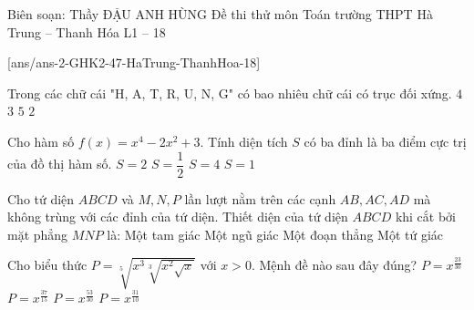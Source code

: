 
\begin{name}
{Biên soạn: Thầy ĐẬU ANH HÙNG}
{Đề thi thử môn Toán trường THPT Hà Trung – Thanh Hóa L1 – 18}
\end{name}
\setcounter{ex}{0}\setcounter{bt}{0}
[ans/ans-2-GHK2-47-HaTrung-ThanhHoa-18]
\begin{ex}%
Trong các chữ cái "H, A, T, R, U, N, G" có bao nhiêu chữ cái có trục đối xứng.
\choice
{\True $4$}
{$3$}
{$5$}
{$2$}
\end{ex}

\begin{ex}%
Cho hàm số $f(x)=x^4-2x^2+3$. Tính diện tích $S$ có ba đỉnh là ba điểm cực trị của đồ thị hàm số.
\choice
{$S=2$}
{$S=\dfrac{1}{2}$}
{$S=4$}
{\True $S=1$}
\end{ex}


\begin{ex}%
Cho tứ diện $ABCD$ và $M, N, P$ lần lượt nằm trên các cạnh $AB, AC, AD$ mà không trùng với các đỉnh của tứ diện. Thiết diện của tứ diện $ABCD$ khi cắt bởi mặt phẳng  $MNP$ là:
\choice
{\True Một tam giác}
{Một ngũ giác}
{Một đoạn thẳng}
{Một tứ giác}
\end{ex}

\begin{ex}%
Cho biểu thức $P=\sqrt[5]{x^3\sqrt[3]{x^2\sqrt{x}}}$ với $x>0$. Mệnh đề nào sau đây đúng?
\choice
{\True $P=x^{\frac{23}{30}}$}
{$P=x^{\frac{37}{15}}$}
{$P=x^{\frac{53}{30}}$}
{$P=x^{\frac{31}{10}}$}
\end{ex}

